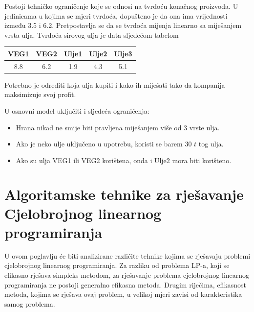\documentclass[b5paper, utf8, 11pt, colorlinks]{book}
\theoremstyle{definition}
\begin{document}
\begin{enumerate}
	Postoji tehničko ograničenje koje se odnosi na tvrdoću konačnog proizvoda. U jedinicama u kojima se mjeri tvrdoća, dopušteno je da ona ima vrijednosti između 3.5 i 6.2. Pretpostavlja se da se tvrdoća mijenja %
	linearno sa miješanjem vrsta ulja. Tvrdoća sirovog ulja je data sljedećom tabelom
	\begin{table}[H]
		\centering
		\begin{tabular}{ccccc}
			VEG1 & VEG2 & Ulje1 & Ulje2 & Ulje3 \\ \hline
			8.8  & 6.2  & 1.9   & 4.3   & 5.1   \\
		\end{tabular} 
	\end{table}
	
	Potrebno je odrediti koja ulja kupiti i kako ih miješati  tako da kompanija maksimizuje svoj profit. 
	
	U osnovni model uključiti i sljedeća ograničenja:
	\begin{itemize}
		\item Hrana nikad ne smije biti  pravljena miješanjem više od 3 vrste ulja. 
		\item Ako je neko ulje uključeno u upotrebu,  koristi se barem 30 $t$ tog ulja.
		\item Ako su ulja VEG1 ili VEG2  korištena, onda i Ulje2 mora biti korišteno.  
	\end{itemize}
	
\end{enumerate}                                                       

 \chapter{Algoritamske tehnike za rješavanje Cjelobrojnog linearnog programiranja}\label{chap:rjesavanjeILP}
 
 U ovom poglavlju će biti analizirane različite tehnike kojima se rješavaju problemi cjelobrojnog linearnog programiranja.
 Za razliku od problema LP-a, koji se efikasno rješava simpleks metodom, za rješavanje problema cjelobrojnog linearnog programiranja ne postoji generalno efikasna metoda. Drugim riječima, efikasnost metoda, kojima se rješava ovaj problem, u velikoj mjeri zavisi od karakteristika samog problema. 
 
\end{document}
